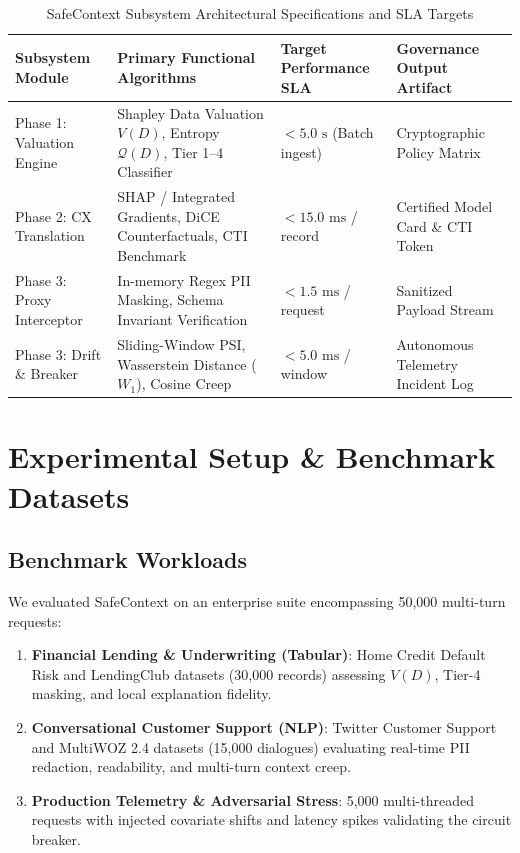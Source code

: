 \documentclass[journal]{IEEEtran}
\begin{document}
\begin{table}[t]
\caption{SafeContext Subsystem Architectural Specifications and SLA Targets}
\label{tab:system_specs}
\centering
\small
\begin{tabular}{p{4.2cm}p{5.5cm}p{3.2cm}p{3.2cm}}
\toprule
\textbf{Subsystem Module} & \textbf{Primary Functional Algorithms} & \textbf{Target Performance SLA} & \textbf{Governance Output Artifact} \\
\midrule
Phase 1: Valuation Engine & Shapley Data Valuation $V(D)$, Entropy $\mathcal{Q}(D)$, Tier 1--4 Classifier & $< 5.0\text{ s}$ (Batch ingest) & Cryptographic Policy Matrix \\
Phase 2: CX Translation & SHAP / Integrated Gradients, DiCE Counterfactuals, CTI Benchmark & $< 15.0\text{ ms}$ / record & Certified Model Card \& CTI Token \\
Phase 3: Proxy Interceptor & In-memory Regex PII Masking, Schema Invariant Verification & $< 1.5\text{ ms}$ / request & Sanitized Payload Stream \\
Phase 3: Drift \& Breaker & Sliding-Window PSI, Wasserstein Distance ($W_1$), Cosine Creep & $< 5.0\text{ ms}$ / window & Autonomous Telemetry Incident Log \\
\bottomrule
\end{tabular}
\end{table}

\section{Experimental Setup \& Benchmark Datasets}

\subsection{Benchmark Workloads}
We evaluated SafeContext on an enterprise suite encompassing 50,000 multi-turn requests:
\begin{enumerate}
    \item \textbf{Financial Lending \& Underwriting (Tabular)}: Home Credit Default Risk and LendingClub datasets (30,000 records) assessing $V(D)$, Tier-4 masking, and local explanation fidelity.
    \item \textbf{Conversational Customer Support (NLP)}: Twitter Customer Support and MultiWOZ 2.4 datasets (15,000 dialogues) evaluating real-time PII redaction, readability, and multi-turn context creep.
    \item \textbf{Production Telemetry \& Adversarial Stress}: 5,000 multi-threaded requests with injected covariate shifts and latency spikes validating the circuit breaker.
\end{enumerate}
\end{document}
